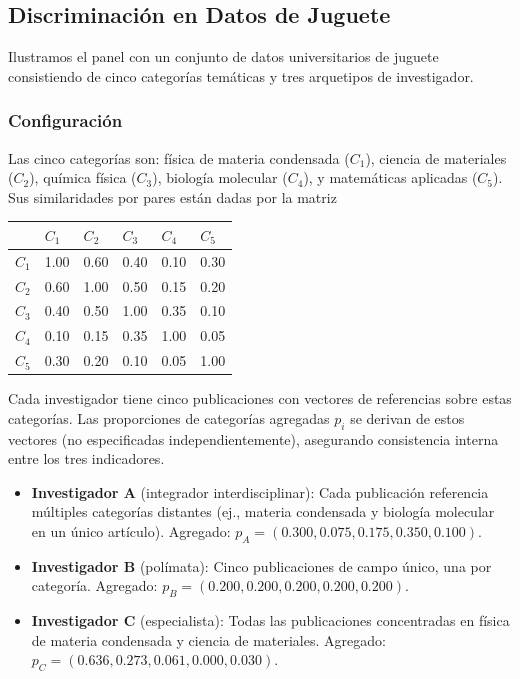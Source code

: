 \documentclass[
]{article}
\providecommand{\tightlist}{%
  \setlength{\itemsep}{0pt}\setlength{\parskip}{0pt}}
\begin{document}
\hypertarget{discriminaciuxf3n-en-datos-de-juguete}{%
\subsection{Discriminación en Datos de
Juguete}\label{discriminaciuxf3n-en-datos-de-juguete}}

Ilustramos el panel con un conjunto de datos universitarios de juguete
consistiendo de cinco categorías temáticas y tres arquetipos de
investigador.

\hypertarget{configuraciuxf3n}{%
\subsubsection{Configuración}\label{configuraciuxf3n}}

Las cinco categorías son: física de materia condensada (\(C_1\)),
ciencia de materiales (\(C_2\)), química física (\(C_3\)), biología
molecular (\(C_4\)), y matemáticas aplicadas (\(C_5\)). Sus
similaridades por pares están dadas por la matriz

\begin{longtable}[]{@{}llllll@{}}
\toprule
& \(C_1\) & \(C_2\) & \(C_3\) & \(C_4\) & \(C_5\) \\
\midrule
\endhead
\(C_1\) & 1.00 & 0.60 & 0.40 & 0.10 & 0.30 \\
\(C_2\) & 0.60 & 1.00 & 0.50 & 0.15 & 0.20 \\
\(C_3\) & 0.40 & 0.50 & 1.00 & 0.35 & 0.10 \\
\(C_4\) & 0.10 & 0.15 & 0.35 & 1.00 & 0.05 \\
\(C_5\) & 0.30 & 0.20 & 0.10 & 0.05 & 1.00 \\
\bottomrule
\end{longtable}

Cada investigador tiene cinco publicaciones con vectores de referencias
sobre estas categorías. Las proporciones de categorías agregadas \(p_i\)
se derivan de estos vectores (no especificadas independientemente),
asegurando consistencia interna entre los tres indicadores.

\begin{itemize}
\tightlist
\item
  \textbf{Investigador A} (integrador interdisciplinar): Cada
  publicación referencia múltiples categorías distantes (ej., materia
  condensada y biología molecular en un único artículo). Agregado:
  \(p_A = (0.300, 0.075, 0.175, 0.350, 0.100)\).
\item
  \textbf{Investigador B} (polímata): Cinco publicaciones de campo
  único, una por categoría. Agregado:
  \(p_B = (0.200, 0.200, 0.200, 0.200, 0.200)\).
\item
  \textbf{Investigador C} (especialista): Todas las publicaciones
  concentradas en física de materia condensada y ciencia de materiales.
  Agregado: \(p_C = (0.636, 0.273, 0.061, 0.000, 0.030)\).
\end{itemize}
\end{document}
